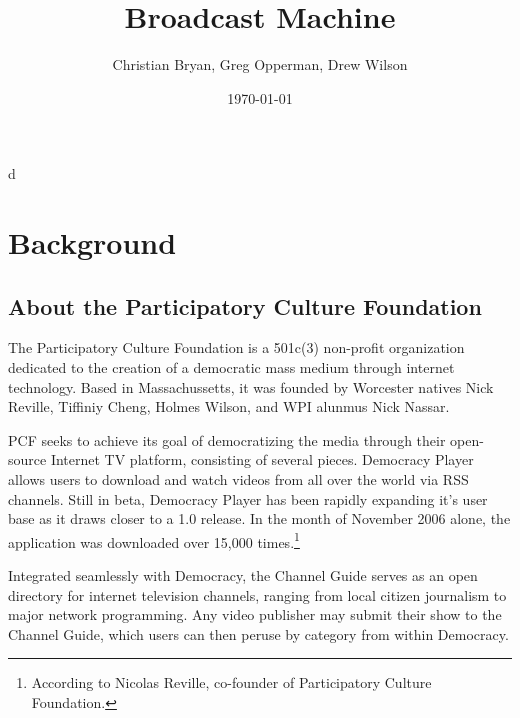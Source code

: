 d\documentclass[a4paper,12pt]{report}
\author{Christian Bryan, Greg Opperman, Drew Wilson}
\date{\today}
\title{Broadcast Machine}
\begin{document}
\maketitle

\tableofcontents

\chapter{Background}

\section{About the Participatory Culture Foundation}
	The Participatory Culture Foundation is a 501c(3) non-profit organization dedicated to the creation of a democratic mass medium through internet technology. 
Based in Massachussetts, it was founded by Worcester natives Nick Reville, Tiffiniy Cheng, Holmes Wilson, and WPI alunmus Nick Nassar.

	PCF seeks to achieve its goal of democratizing the media through their open-source Internet TV platform, consisting of several pieces.  Democracy Player allows users to download and watch videos from all over the world via RSS channels. 
Still in beta, Democracy Player has been rapidly expanding it's user base as it draws closer to a 1.0 release. 
In the month of November 2006 alone, the application was downloaded over 15,000 times.\footnote{According to Nicolas Reville, co-founder of Participatory Culture Foundation.}

Integrated seamlessly with Democracy, the Channel Guide serves as an open directory for internet television channels, ranging from local citizen journalism to major network programming. 
Any video publisher may submit their show to the Channel Guide, which users can then peruse by category from within Democracy.
\end{document}
